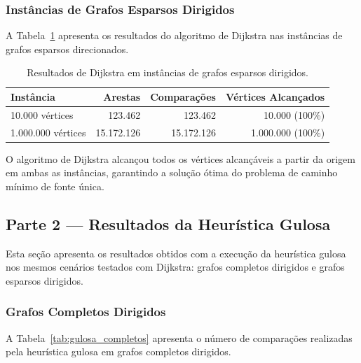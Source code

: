 \documentclass[12pt,a4paper]{article}
\begin{document}
\subsubsection{Instâncias de Grafos Esparsos Dirigidos}

A Tabela~\ref{tab:dijkstra_reais} apresenta os resultados do algoritmo de Dijkstra nas instâncias de grafos esparsos direcionados.

\begin{table}[H]
    \centering
    \small
    \caption{Resultados de Dijkstra em instâncias de grafos esparsos dirigidos.}
    \label{tab:dijkstra_reais}
    \begin{tabular}{@{}lrrr@{}}
        \toprule
        \textbf{Instância} & \textbf{Arestas} & \textbf{Comparações} & \textbf{Vértices Alcançados} \\
        \midrule
        10.000 vértices    & 123.462   & 123.462      & 10.000 (100\%) \\
        1.000.000 vértices & 15.172.126 & 15.172.126   & 1.000.000 (100\%) \\
        \bottomrule
    \end{tabular}
\end{table}

O algoritmo de Dijkstra alcançou todos os vértices alcançáveis a partir da origem em ambas as instâncias, garantindo a solução ótima do problema de caminho mínimo de fonte única.

\subsection{Parte 2 — Resultados da Heurística Gulosa}

Esta seção apresenta os resultados obtidos com a execução da heurística gulosa nos mesmos cenários testados com Dijkstra: grafos completos dirigidos e grafos esparsos dirigidos.

\subsubsection{Grafos Completos Dirigidos}

A Tabela~\ref{tab:gulosa_completos} apresenta o número de comparações realizadas pela heurística gulosa em grafos completos dirigidos.
\end{document}
